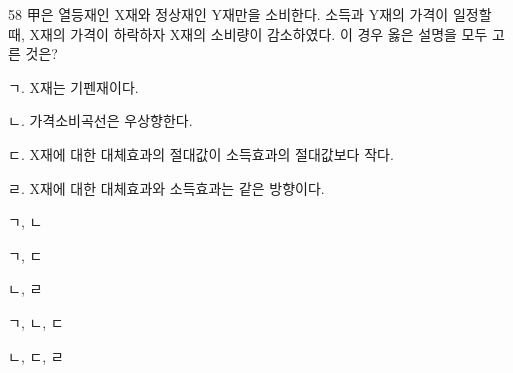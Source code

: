 \begin{question}{58}
甲은 열등재인 X재와 정상재인 Y재만을 소비한다. 소득과 Y재의 가격이 일정할 때, X재의 가격이 하락하자 X재의 소비량이 감소하였다. 이 경우 옳은 설명을 모두 고른 것은?
\begin{framedtext}
ㄱ. X재는 기펜재이다. \par
ㄴ. 가격소비곡선은 우상향한다. \par
ㄷ. X재에 대한 대체효과의 절대값이 소득효과의 절대값보다 작다. \par
ㄹ. X재에 대한 대체효과와 소득효과는 같은 방향이다. \par
\end{framedtext}
\begin{choices}
  \item ㄱ, ㄴ
  \item ㄱ, ㄷ
  \item ㄴ, ㄹ
  \item ㄱ, ㄴ, ㄷ
  \item ㄴ, ㄷ, ㄹ
\end{choices}
\end{question}
